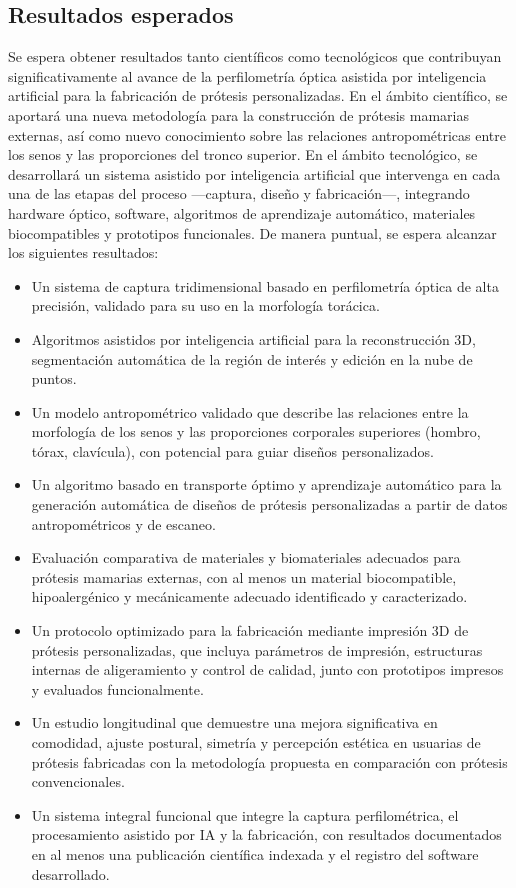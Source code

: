 \documentclass[12pt,a4paper]{article}
\begin{document}
\subsection{Resultados esperados}
Se espera obtener resultados tanto científicos como tecnológicos que contribuyan significativamente al avance de la perfilometría óptica asistida por inteligencia artificial para la fabricación de prótesis personalizadas. En el ámbito científico, se aportará una nueva metodología para la construcción de prótesis mamarias externas, así como nuevo conocimiento sobre las relaciones antropométricas entre los senos y las proporciones del tronco superior. En el ámbito tecnológico, se desarrollará un sistema asistido por inteligencia artificial que intervenga en cada una de las etapas del proceso —captura, diseño y fabricación—, integrando hardware óptico, software, algoritmos de aprendizaje automático, materiales biocompatibles y prototipos funcionales. De manera puntual, se espera alcanzar los siguientes resultados:

\begin{itemize}
\item Un sistema de captura tridimensional basado en perfilometría óptica de alta precisión, validado para su uso en la morfología torácica.
\item Algoritmos asistidos por inteligencia artificial para la reconstrucción 3D, segmentación automática de la región de interés y edición en la nube de puntos.
\item Un modelo antropométrico validado que describe las relaciones entre la morfología de los senos y las proporciones corporales superiores (hombro, tórax, clavícula), con potencial para guiar diseños personalizados.
\item Un algoritmo basado en transporte óptimo y aprendizaje automático para la generación automática de diseños de prótesis personalizadas a partir de datos antropométricos y de escaneo.
\item Evaluación comparativa de materiales y biomateriales adecuados para prótesis mamarias externas, con al menos un material biocompatible, hipoalergénico y mecánicamente adecuado identificado y caracterizado.
\item Un protocolo optimizado para la fabricación mediante impresión 3D de prótesis personalizadas, que incluya parámetros de impresión, estructuras internas de aligeramiento y control de calidad, junto con prototipos impresos y evaluados funcionalmente.
\item Un estudio longitudinal que demuestre una mejora significativa en comodidad, ajuste postural, simetría y percepción estética en usuarias de prótesis fabricadas con la metodología propuesta en comparación con prótesis convencionales.
\item Un sistema integral funcional que integre la captura perfilométrica, el procesamiento asistido por IA y la fabricación, con resultados documentados en al menos una publicación científica indexada y el registro del software desarrollado.
\end{itemize}
\end{document}
